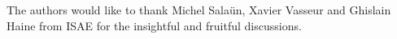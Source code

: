 \documentclass{ifacconf}
\begin{document}
\begin{ack}
	The authors would like to thank Michel Sala\"un, Xavier Vasseur and Ghislain Haine from ISAE for the insightful and fruitful discussions.
\end{ack}

                                                   







\appendix

      
\end{document}
